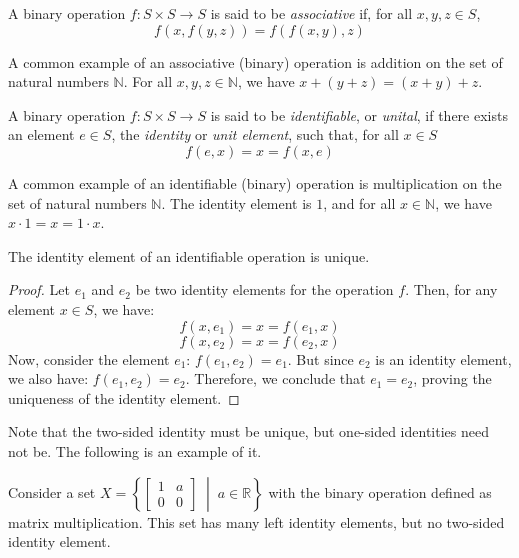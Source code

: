 \documentclass[
	11pt, %
	fleqn, %
	a4paper, %
]{LegrandOrangeBook}
\begin{document}
\begin{definition}[Associative]
    A binary operation $f: S \times S \to S$ is said to be \emph{associative} if, for all $x,y,z \in S$, 
    \[ f(x,f(y,z)) = f(f(x,y),z) \]
\end{definition}

\begin{example}
    A common example of an associative (binary) operation is addition on the set of natural numbers $\mathbb{N}$. For all $x,y,z \in \mathbb{N}$, we have $x + (y + z) = (x + y) + z$.
\end{example}

\begin{definition}[Identifiable]
    A binary operation $f: S \times S \to S$ is said to be \emph{identifiable}, or \emph{unital}, if there exists an element $e \in S$, the \emph{identity} or \emph{unit element}, such that, for all $x \in S$
    \[ f(e,x) = x = f(x,e) \]
\end{definition}

\begin{example}
    A common example of an identifiable (binary) operation is multiplication on the set of natural numbers $\mathbb{N}$. The identity element is $1$, and for all $x \in \mathbb{N}$, we have $x \cdot 1 = x = 1 \cdot x$.
\end{example}

\begin{proposition}
    The identity element of an identifiable operation is unique.
\end{proposition}

\begin{proof}
    Let $e_1$ and $e_2$ be two identity elements for the operation $f$. Then, for any element $x \in S$, we have:
    \[ f(x,e_1) = x = f(e_1,x) \]
    \[ f(x,e_2) = x = f(e_2,x) \]
    Now, consider the element $e_1$: $f(e_1,e_2) = e_1$.
    But since $e_2$ is an identity element, we also have: $f(e_1,e_2) = e_2$.
    Therefore, we conclude that $e_1 = e_2$, proving the uniqueness of the identity element.
\end{proof}

Note that the two-sided identity must be unique, but one-sided identities need not be. The following is an example of it.

\begin{example}
    Consider a set $X = \left\{ \begin{bmatrix}
        1 & a \\
        0 & 0 
    \end{bmatrix} \; \middle| \; a \in \mathbb{R} \right\}$ with the binary operation defined as matrix multiplication. This set has many left identity elements, but no two-sided identity element.
\end{example}
\end{document}
